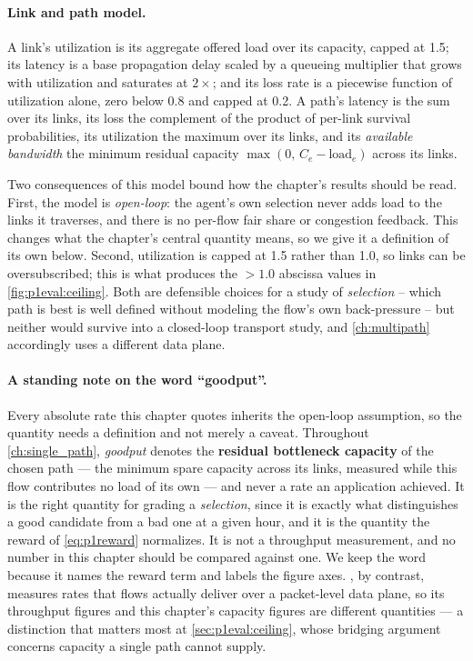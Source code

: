 \paragraph{Link and path model.} A link's utilization is its aggregate offered load over its capacity,
capped at 1.5; its latency is a base propagation delay scaled by a queueing multiplier that grows with
utilization and saturates at $2\times$; and its loss rate is a piecewise function of utilization alone,
zero below 0.8 and capped at 0.2. A path's latency is the sum over its links, its loss the complement of
the product of per-link survival probabilities, its utilization the maximum over its links, and its
\emph{available bandwidth} the minimum residual capacity $\max(0,\,C_e - \mathrm{load}_e)$ across its
links.

Two consequences of this model bound how the chapter's results should be read. First, the model is
\emph{open-loop}: the agent's own selection
never adds load to the links it traverses, and there is no per-flow fair share or congestion feedback.
This changes what the chapter's central quantity means, so we give it a definition of its own below.
Second, utilization is capped at 1.5 rather than 1.0, so links can be
oversubscribed; this is what produces the $>1.0$ abscissa values in \cref{fig:p1eval:ceiling}. Both are
defensible choices for a study of \emph{selection} -- which path is best is well defined without
modeling the flow's own back-pressure -- but neither would survive into a closed-loop transport study,
and \cref{ch:multipath} accordingly uses a different data plane.

\paragraph{A standing note on the word ``goodput''.} Every absolute rate this chapter quotes inherits the
open-loop assumption, so the quantity needs a definition and not merely a caveat. Throughout
\cref{ch:single_path}, \emph{goodput} denotes the \textbf{residual bottleneck capacity} of the chosen
path --- the minimum spare capacity across its links, measured while this flow contributes no load of its
own --- and never a rate an application achieved. It is the right quantity for grading a
\emph{selection}, since it is exactly what distinguishes a good candidate from a bad one at a given hour,
and it is the quantity the reward of \cref{eq:p1reward} normalizes. It is not a throughput measurement,
and no number in this chapter should be compared against one. We keep the word because it names the
reward term and labels the figure axes. , by contrast, measures rates that flows
actually deliver over a packet-level data plane, so its throughput figures and this chapter's capacity
figures are different quantities --- a distinction that matters most at \cref{sec:p1eval:ceiling}, whose
bridging argument concerns capacity a single path cannot supply.

